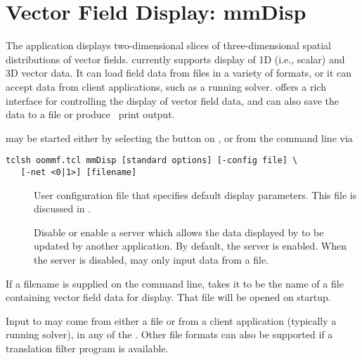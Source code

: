 \section{Vector Field Display: mmDisp}\label{sec:mmdisp}%

\begin{center}
\end{center}

The application  displays two-dimensional slices of
three-dimensional spatial distributions of vector fields.  
currently supports display of 1D (i.e., scalar) and 3D vector data.  It
can load field data from files in a variety of formats, or it can accept
data from client applications, such as a running solver.  
offers a rich interface for controlling the display of vector field
data, and can also save the data to a file or produce \postscript\ print
output.

 may be started either by selecting the  button
on , or from the command line via
\begin{verbatim}
tclsh oommf.tcl mmDisp [standard options] [-config file] \
   [-net <0|1>] [filename]
\end{verbatim}

\begin{description}
\item[]
  User configuration file that specifies default display parameters.
  This file is discussed in
  .
\item[]
  Disable or enable a server which allows the data displayed by
   to be updated by another application.
  By default, the server is enabled.  When the server is disabled,
  \app{mmDisp} may only input data from a file.
\end{description}

If a filename is supplied on the command line,  takes
it to be the name of a file containing vector field data for display.
That file will be opened on startup.

Input to  may come from either a file or from a client
application (typically a running solver), in any of the
.
Other file formats can also be supported if a translation filter program
is available.

